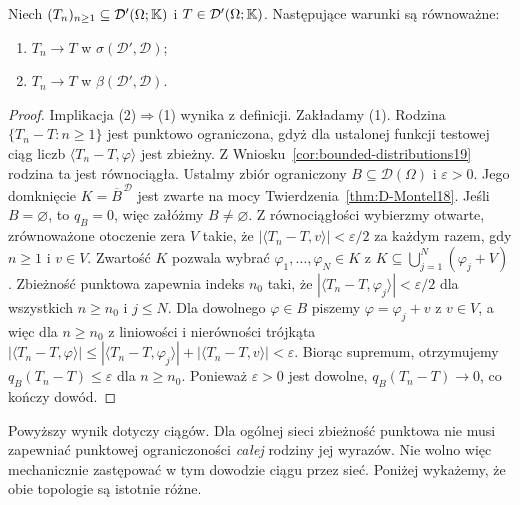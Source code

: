 \begin{twierdzenie}[Zbieżność ciągów: słaba-* = silna]
\label{thm:weak-strong-sequences19}
Niech $(T_n)_{n\ge1}\subseteq\mathcal D'(\Omega;\mathbb K)$
i $T\in\mathcal D'(\Omega;\mathbb K)$. Następujące warunki
są równoważne:
\begin{enumerate}
\item $T_n\to T$ w $\sigma(\mathcal D',\mathcal D)$;
\item $T_n\to T$ w $\beta(\mathcal D',\mathcal D)$.
\end{enumerate}
\end{twierdzenie}
\begin{proof}
Implikacja (2)$\Rightarrow$(1) wynika z definicji.
Zakładamy (1). Rodzina $\{T_n-T:n\ge1\}$ jest
punktowo ograniczona, gdyż dla ustalonej funkcji
testowej ciąg liczb $\langle T_n-T,\varphi\rangle$
jest zbieżny. Z Wniosku~\ref{cor:bounded-distributions19}
rodzina ta jest równociągła. Ustalmy zbiór ograniczony
$B\subseteq\mathcal D(\Omega)$ i $\varepsilon>0$.
Jego domknięcie $K=\overline B^{\,\mathcal D}$ jest zwarte
na mocy Twierdzenia~\ref{thm:D-Montel18}.
Jeśli $B=\varnothing$, to $q_B=0$, więc załóżmy $B\ne\varnothing$.
Z równociągłości wybierzmy otwarte, zrównoważone otoczenie
zera $V$ takie, że
$|\langle T_n-T,v\rangle|<\varepsilon/2$
za każdym razem, gdy $n\ge1$ i $v\in V$.
Zwartość $K$ pozwala wybrać
$\varphi_1,\ldots,\varphi_N\in K$ z
$K\subseteq\bigcup_{j=1}^N(\varphi_j+V)$.
Zbieżność punktowa zapewnia indeks $n_0$ taki, że
$|\langle T_n-T,\varphi_j\rangle|<\varepsilon/2$
dla wszystkich $n\ge n_0$ i $j\le N$.
Dla dowolnego $\varphi\in B$ piszemy
$\varphi=\varphi_j+v$ z $v\in V$, a więc dla $n\ge n_0$ z liniowości i nierówności trójkąta
$|\langle T_n-T,\varphi\rangle|
\le|\langle T_n-T,\varphi_j\rangle|+|\langle T_n-T,v\rangle|
<\varepsilon$.
Biorąc supremum, otrzymujemy $q_B(T_n-T)\le\varepsilon$
dla $n\ge n_0$. Ponieważ $\varepsilon>0$ jest dowolne,
$q_B(T_n-T)\to0$, co kończy dowód.
\end{proof}

\begin{uwaga}
\label{rem:net-distinction19}
Powyższy wynik dotyczy ciągów. Dla ogólnej sieci
zbieżność punktowa nie musi zapewniać punktowej
ograniczoności \emph{całej} rodziny jej wyrazów.
Nie wolno więc mechanicznie zastępować w tym dowodzie
ciągu przez sieć. Poniżej wykażemy, że obie topologie
są istotnie różne.
\end{uwaga}

